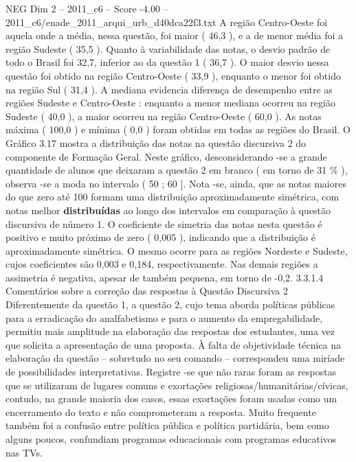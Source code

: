 \begin{textsample}{NEG Dim 2 – 2011\_c6 – Score -4.00 – 2011\_c6/enade\_2011\_arqui\_urb\_d40dca22f3.txt}
A região Centro-Oeste foi aquela onde a média, nessa questão, foi maior ( 46,3 ), e a de menor média foi a região Sudeste ( 35,5 ).
Quanto à variabilidade das notas, o desvio padrão de todo o Brasil foi 32,7, inferior ao da questão 1 ( 36,7 ).
O maior desvio nessa questão foi obtido na região Centro-Oeste ( 33,9 ), enquanto o menor foi obtido na região Sul ( 31,4 ).
A mediana evidencia diferença de desempenho entre as regiões Sudeste e Centro-Oeste : enquanto a menor mediana ocorreu na região Sudeste ( 40,0 ), a maior ocorreu na região Centro-Oeste ( 60,0 ).
As notas máxima ( 100,0 ) e mínima ( 0,0 ) foram obtidas em todas as regiões do Brasil.
O Gráfico 3.17 mostra a distribuição das notas na questão discursiva 2 do componente de Formação Geral.
Neste gráfico, desconsiderando -se a grande quantidade de alunos que deixaram a questão 2 em branco ( em torno de 31 \% ), observa -se a moda no intervalo ( 50 ; 60 ].
Nota -se, ainda, que as notas maiores do que zero até 100 formam uma distribuição aproximadamente simétrica, com notas melhor \textbf{distribuídas} ao longo dos intervalos em comparação à questão discursiva de número 1.
O coeficiente de simetria das notas nesta questão é positivo e muito próximo de zero ( 0,005 ), indicando que a distribuição é aproximadamente simétrica.
O mesmo ocorre para as regiões Nordeste e Sudeste, cujos coeficientes são 0,003 e 0,184, respectivamente.
Nas demais regiões a assimetria é negativa, apesar de também pequena, em torno de -0,2. 3.3.1.4 Comentários sobre a correção das respostas à Questão Discursiva 2 Diferentemente da questão 1, a questão 2, cujo tema aborda políticas públicas para a erradicação do analfabetismo e para o aumento da empregabilidade, permitiu mais amplitude na elaboração das respostas dos estudantes, uma vez que solicita a apresentação de uma proposta.
À falta de objetividade técnica na elaboração da questão – sobretudo no seu comando – correspondeu uma miríade de possibilidades interpretativas.
Registre -se que não raras foram as respostas que se utilizaram de lugares comuns e exortações religiosas/humanitárias/cívicas, contudo, na grande maioria dos casos, essas exortações foram usadas como um encerramento do texto e não comprometeram a resposta.
Muito frequente também foi a confusão entre política pública e política partidária, bem como alguns poucos, confundiam programas educacionais com programas educativos nas TVs.

\end{textsample}
